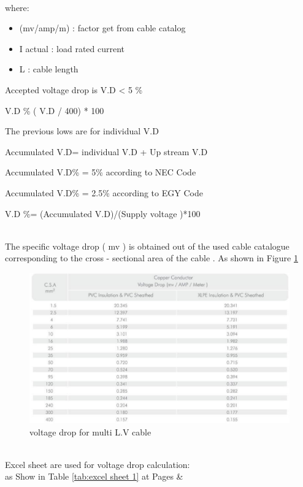 \documentclass[12pt,fleqn]{book} %
\begin{document}
    \\ where:
    \begin{itemize}
    \item (mv/amp/m) : factor get from cable catalog 
    \item I actual  : load rated current
    \item L : cable length
     \end{itemize}
     \begin{note}
	Accepted voltage drop is V.D < 5 \%
\end{note}
       \begin{note}
	 V.D \% ( V.D / 400) * 100 
\end{note}


      \begin{note}
	 The previous lows are for individual V.D
	  \label{note:The previous lows are for individual V.D}
\end{note}
    \begin{note}
	Accumulated V.D= individual V.D + Up stream V.D
\end{note}
    \begin{note}
	 Accumulated V.D\% = 5\% according to NEC Code
\end{note}
    \begin{note}
	 Accumulated V.D\% = 2.5\% according to EGY Code
\end{note}
 \begin{note}
	 V.D \%=  (Accumulated V.D)/(Supply voltage )*100
\end{note}
\\ The specific voltage drop ( mv ) is obtained out of the used cable catalogue corresponding to the cross - sectional area of the cable . As shown in Figure \ref{fig:yousef 9}

 \begin{figure}[!h]
    \centering
    \includegraphics[width=0.8\linewidth]{yousef 9.png}
    \caption{  voltage drop for multi L.V cable }
    \label{fig:yousef 9}
\end{figure}
\newpage
\\  Excel sheet are used for voltage drop calculation: 
\\as Show in Table \ref{tab:excel sheet 1}  at Pages \pageref{tab:excel sheet 1} \& \pageref{tab:excel sheet 2}
\end{document}
